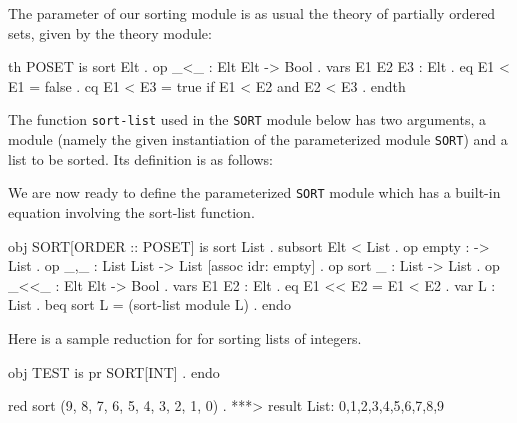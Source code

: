 The parameter of our sorting module is as usual the theory of
partially ordered sets, given by the theory module:

\bobj
th POSET is
  sort Elt .
  op _<_ : Elt Elt -> Bool .
  vars E1 E2 E3 : Elt .
  eq E1 < E1 = false .
  cq E1 < E3 = true if E1 < E2 and E2 < E3 .
endth
\eobj

The function {\tt sort-list} used in the {\tt SORT} module below has
two arguments, a module (namely the given instantiation of the
parameterized module {\tt SORT}) and a list to be sorted.  Its
definition is as follows:


We are now ready to define the parameterized {\tt SORT} module which has
a built-in equation involving the sort-list function.

\bobj
obj SORT[ORDER :: POSET] is
  sort List .
  subsort Elt < List .
  op empty : -> List .
  op _,_ : List List -> List [assoc idr: empty] .
  op sort _ : List -> List .
  op _<<_ : Elt Elt -> Bool .
  vars E1 E2 : Elt .
  eq E1 << E2 = E1 < E2 .
  var L : List .
  beq sort L = (sort-list module L) .
endo
\eobj

Here is a sample reduction for for sorting lists of integers.

\bobj
obj TEST is pr SORT[INT] . endo

red sort (9, 8, 7, 6, 5, 4, 3, 2, 1, 0) .
***> result List: 0,1,2,3,4,5,6,7,8,9
\eobj


